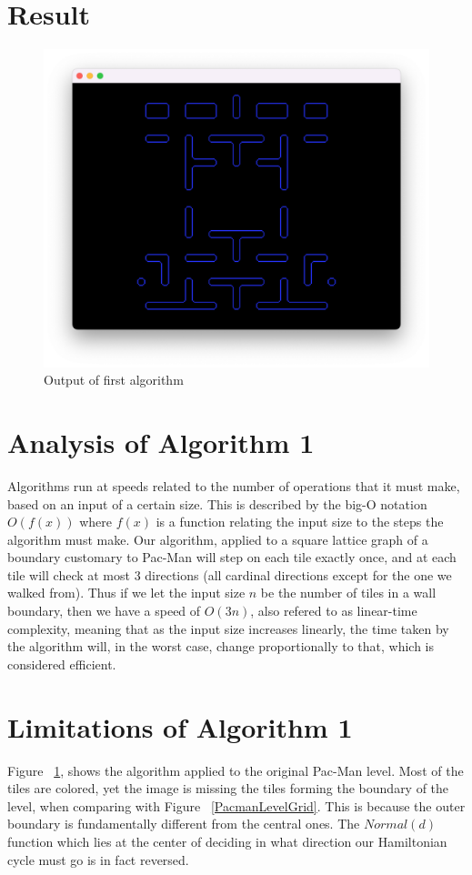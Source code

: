 \section{Result}
\begin{figure}[H]
\centering
\includegraphics[width=0.8\linewidth]{Image-8.png}
\caption {Output of first algorithm\autocite{myself}}\label{FirstOutput}
\end{figure}

\section{Analysis of Algorithm 1}
Algorithms run at speeds related to the number of operations that it must make, based on an input of a certain size. This is described by the big-O notation $O(f(x))$ where $f(x)$ is a function relating the input size to the steps the algorithm must make. Our algorithm, applied to a square lattice graph of a boundary customary to Pac-Man will step on each tile exactly once, and at each tile will check at most 3 directions (all cardinal directions except for the one we walked from). Thus if we let the input size $n$ be the number of tiles in a wall boundary, then we have a speed of $O(3n)$, also refered to as linear-time complexity, meaning that as the input size increases linearly, the time taken by the algorithm will, in the worst case, change proportionally to that, which is considered efficient. 

\section{Limitations of Algorithm 1}
Figure ~\ref{FirstOutput}, shows the algorithm applied to the original Pac-Man level. Most of the tiles are colored, yet the image is missing the tiles forming the boundary of the level, when comparing with Figure ~\ref{PacmanLevelGrid}. This is because the outer boundary is fundamentally different from the central ones. 
The $Normal(d)$ function which lies at the center of deciding in what direction our Hamiltonian cycle must go is in fact reversed. 